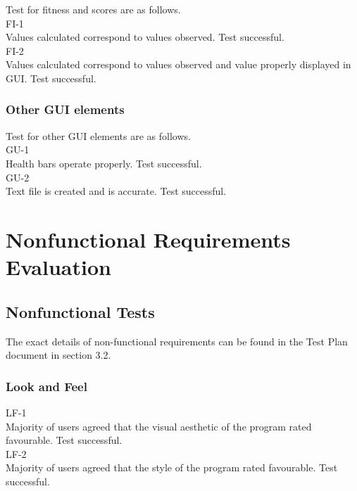 \documentclass[12pt, titlepage]{article}
\begin{document}
Test for fitness and scores are as follows.\\

FI-1\\

Values calculated correspond to values observed. Test successful.\\

FI-2\\

Values calculated correspond to values observed and value properly displayed in GUI. Test successful.

\subsubsection{Other GUI elements}

Test for other GUI elements are as follows.\\

GU-1\\

Health bars operate properly. Test successful.\\

GU-2\\

Text file is created and is accurate. Test successful.

\section{Nonfunctional Requirements Evaluation}

\subsection{Nonfunctional Tests}

The exact details of non-functional requirements can be found in the Test Plan document in section 3.2.


\subsubsection{Look and Feel}

LF-1\\

Majority of users agreed that the visual aesthetic of the program rated favourable. Test successful.\\

LF-2\\

Majority of users agreed that the style of the program rated favourable. Test successful.
\end{document}
